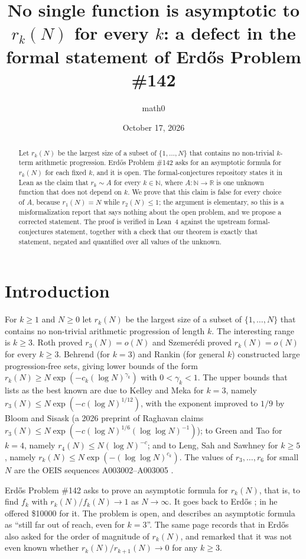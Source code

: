 \documentclass[11pt]{amsart}
\title[No $k$-independent asymptotic formula for $r_k(N)$]{No single function is asymptotic to $r_k(N)$ for every $k$: a defect in the formal statement of Erd\H{o}s Problem \#142}
\author{math0}
\date{October 17, 2026}
\theoremstyle{plain}
\theoremstyle{definition}
\newcommand{\N}{\mathbb{N}}
\newcommand{\R}{\mathbb{R}}
\begin{document}
\begin{abstract}
Let $r_k(N)$ be the largest size of a subset of $\{1,\dots,N\}$ that contains no non-trivial $k$-term arithmetic progression. Erd\H{o}s Problem \#142 asks for an asymptotic formula for $r_k(N)$ for each fixed $k$, and it is open. The formal-conjectures repository states it in Lean as the claim that $r_k\sim A$ for every $k\in\N$, where $A\colon\N\to\R$ is one unknown function that does not depend on $k$. We prove that this claim is false for every choice of $A$, because $r_1(N)=N$ while $r_2(N)\le 1$; the argument is elementary, so this is a misformalization report that says nothing about the open problem, and we propose a corrected statement. The proof is verified in Lean~4 against the upstream formal-conjectures statement, together with a check that our theorem is exactly that statement, negated and quantified over all values of the unknown.
\end{abstract}
\maketitle

\section{Introduction}

For $k\ge 1$ and $N\ge 0$ let $r_k(N)$ be the largest size of a subset of $\{1,\dots,N\}$ that contains no non-trivial arithmetic progression of length $k$. The interesting range is $k\ge 3$. Roth \cite{Ro53} proved $r_3(N)=o(N)$ and Szemer\'edi \cite{Sz75} proved $r_k(N)=o(N)$ for every $k\ge 3$. Behrend \cite{Be46} (for $k=3$) and Rankin \cite{Ra61} (for general $k$) constructed large progression-free sets, giving lower bounds of the form $r_k(N)\ge N\exp(-c_k(\log N)^{\gamma_k})$ with $0<\gamma_k<1$. The upper bounds that \cite{EP142} lists as the best known are due to Kelley and Meka \cite{KM23} for $k=3$, namely $r_3(N)\le N\exp(-c(\log N)^{1/12})$, with the exponent improved to $1/9$ by Bloom and Sisask \cite{BS23} (a 2026 preprint of Raghavan \cite{Rag26} claims $r_3(N)\le N\exp(-c(\log N)^{1/6}(\log\log N)^{-1})$); to Green and Tao \cite{GT17} for $k=4$, namely $r_4(N)\le N(\log N)^{-c}$; and to Leng, Sah and Sawhney \cite{LSS24} for $k\ge 5$, namely $r_k(N)\le N\exp(-(\log\log N)^{c_k})$. The values of $r_3,\dots,r_6$ for small $N$ are the OEIS sequences A003002--A003005 \cite{OEIS}.

Erd\H{o}s Problem \#142 \cite{EP142} asks to prove an asymptotic formula for $r_k(N)$, that is, to find $f_k$ with $r_k(N)/f_k(N)\to 1$ as $N\to\infty$. It goes back to Erd\H{o}s \cite{Er80,Er81,Er97}; in \cite{Er81} he offered \$10000 for it. The problem is open, and \cite{EP142} describes an asymptotic formula as ``still far out of reach, even for $k=3$''. The same page records that in \cite{Er80} Erd\H{o}s also asked for the order of magnitude of $r_k(N)$, and remarked that it was not even known whether $r_k(N)/r_{k+1}(N)\to 0$ for any $k\ge 3$.
\end{document}
